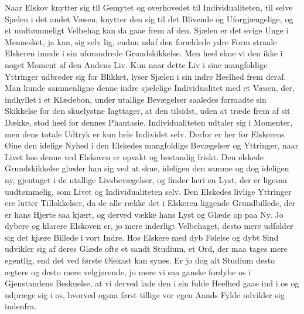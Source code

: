 \documentclass[12pt,a4paper]{book}
\newcommand{\apage}[1]{\marginnote{\footnotesize\textit{[#1]}}}
\begin{document}
Naar Elskov knytter sig til Gemytet og overhovedet til
Individualiteten, til selve Sjælen i det andet Væsen, knytter den sig
til det Blivende og Uforgjængelige, og et uudtømmeligt Velbehag kan da
gaae frem af den. Sjælen er det evige Unge i Mennesket, ja kan, sig selv
lig, endnu udaf den forældede ydre Form straale Elskeren imøde i sin
uforandrede Grundskikkelse. Men heel skue vi den ikke i noget Moment af
den Andens Liv. Kun naar dette Liv i sine mangfoldige Yttringer udbreder
sig for Blikket, lyser Sjælen i sin indre Heelhed frem deraf. Man kunde
sammenligne denne indre sjælelige Individualitet med et Væsen, der,
indhyllet i et Klædebon, under utallige Bevægelser saaledes forraadte
sin Skikkelse for den skuelystne Iagttager, at den tilsidst, uden at
træde frem af sit Dække, stod heel for dennes Phantasie.
Individualiteten udtaler sig i Momenter, men dens totale Udtryk er kun
hele Individet selv. Derfor er her for Elskerens Øine den idelige Nyhed
i den Elskedes mangfoldige Bevægelser \apage{13} og Yttringer, naar Livet hos
denne ved Elskoven er opvakt og bestandig friskt. Den elskede
Grundskikkelse glæder han sig ved at skue, ideligen den samme og dog
ideligen ny, gjentaget i de utallige Livsbevægelser, og finder heri en
Lyst, der er ligesaa uudtømmelig, som Livet og Individualiteten selv.
Den Elskedes livlige Yttringer ere lutter Tillokkelser, da de alle
række det i Elskeren liggende Grundbillede, der er hans Hjerte saa
kjært, og derved vække hans Lyst og Glæde op paa Ny. Jo dybere og
klarere Elskoven er, jo mere inderligt Velbehaget, desto mere udfolder
sig det kjære Billede i vort Indre. Hos Elskere med dyb Følelse og dybt
Sind udvikler sig af deres Glæde ofte et sandt Studium, et Ord, der maa
tages mere egentlig, end det ved første Øiekast kan synes. Er jo dog
alt Studium desto ægtere og desto mere velgjørende, jo mere vi saa
ganske fordybe os i Gjenstandens Beskuelse, at vi derved lade den i sin
fulde Heelhed gaae ind i os og udpræge sig i os, hvorved ogsaa først
tillige vor egen Aands Fylde udvikler sig indenfra.
\end{document}
